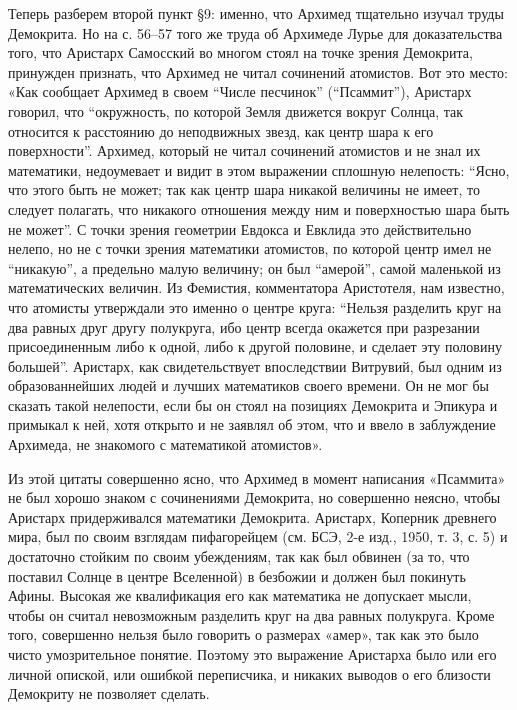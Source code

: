 Теперь разберем второй пункт §9:  именно, что Архимед тщательно изучал
труды Демокрита. Но  на с. 56--57 того же труда  об Архимеде Лурье для
доказательства того, что  Аристарх Самосский во многом  стоял на точке
зрения Демокрита,  принужден признать, что Архимед  не читал сочинений
атомистов.  Вот  это место:  «Как  сообщает  Архимед в  своем  ``Числе
песчинок''  (``Псаммит''),  Аристарх  говорил,  что  ``окружность,  по
которой Земля  движется вокруг Солнца,  так относится к  расстоянию до
неподвижных  звезд,  как  центр  шара к  его  поверхности''.  Архимед,
который  не  читал  сочинений  атомистов  и  не  знал  их  математики,
недоумевает и видит  в этом выражении сплошную  нелепость: ``Ясно, что
этого быть не может; так как  центр шара никакой величины не имеет, то
следует полагать, что никакого отношения между ним и поверхностью шара
быть  не может''.  С  точки  зрения геометрии  Евдокса  и Евклида  это
действительно нелепо,  но не с  точки зрения математики  атомистов, по
которой центр имел не ``никакую'',  а предельно малую величину; он был
``амерой'', самой  маленькой из  математических величин.  Из Фемистия,
комментатора  Аристотеля, нам  известно, что  атомисты утверждали  это
именно  о  центре  круга:  ``Нельзя   разделить  круг  на  два  равных
друг  другу  полукруга,  ибо  центр  всегда  окажется  при  разрезании
присоединенным  либо  к  одной,  либо к  другой  половине,  и  сделает
эту  половину большей''.  Аристарх,  как свидетельствует  впоследствии
Витрувий,  был одним  из  образованнейших людей  и лучших  математиков
своего времени. Он не мог бы сказать такой нелепости, если бы он стоял
на позициях  Демокрита и Эпикура и  примыкал к ней, хотя  открыто и не
заявлял об  этом, что и ввело  в заблуждение Архимеда, не  знакомого с
математикой атомистов».

Из  этой  цитаты  совершенно  ясно, что  Архимед  в  момент  написания
«Псаммита» не был хорошо знаком с сочинениями Демокрита, но совершенно
неясно, чтобы  Аристарх придерживался математики  Демокрита. Аристарх,
Коперник древнего мира,  был по своим взглядам  пифагорейцем (см. БСЭ,
2-е изд., 1950, т. 3, с.  5) и достаточно стойким по своим убеждениям,
так как был обвинен (за то,  что поставил Солнце в центре Вселенной) в
безбожии и должен был покинуть  Афины. Высокая же квалификация его как
математика не  допускает мысли, чтобы он  считал невозможным разделить
круг  на два  равных  полукруга. Кроме  того,  совершенно нельзя  было
говорить  о размерах  «амер»,  так как  это  было чисто  умозрительное
понятие. Поэтому это выражение Аристарха  было или его личной опиской,
или ошибкой переписчика, и никаких выводов о его близости Демокриту не
позволяет сделать.

